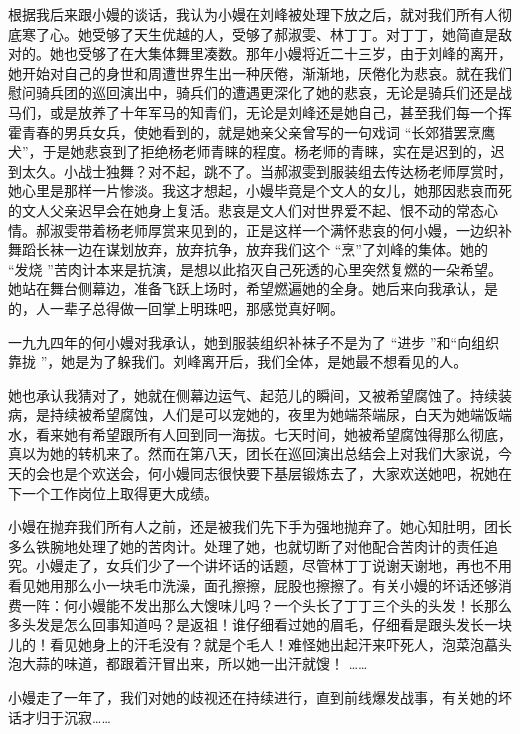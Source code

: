 \documentclass[12pt,twoside,openany]{book}
\begin{document}
根据我后来跟小嫚的谈话，我认为小嫚在刘峰被处理下放之后，就对我们所有人彻底寒了心。她受够了天生优越的人，受够了郝淑雯、林丁丁。对丁丁，她简直是敌对的。她也受够了在大集体舞里凑数。那年小嫚将近二十三岁，由于刘峰的离开，她开始对自己的身世和周遭世界生出一种厌倦，渐渐地，厌倦化为悲哀。就在我们慰问骑兵团的巡回演出中，骑兵们的遭遇更深化了她的悲哀，无论是骑兵们还是战马们，或是放养了十年军马的知青们，无论是刘峰还是她自己，甚至我们每一个挥霍青春的男兵女兵，使她看到的，就是她亲父亲曾写的一句戏词 “长郊猎罢烹鹰犬”，于是她悲哀到了拒绝杨老师青睐的程度。杨老师的青睐，实在是迟到的，迟到太久。小战士独舞？对不起，跳不了。当郝淑雯到服装组去传达杨老师厚赏时，她心里是那样一片惨淡。我这才想起，小嫚毕竟是个文人的女儿，她那因悲哀而死的文人父亲迟早会在她身上复活。悲哀是文人们对世界爱不起、恨不动的常态心情。郝淑雯带着杨老师厚赏来见到的，正是这样一个满怀悲哀的何小嫚，一边织补舞蹈长袜一边在谋划放弃，放弃抗争，放弃我们这个 “烹”了刘峰的集体。她的 “发烧 ”苦肉计本来是抗演，是想以此掐灭自己死透的心里突然复燃的一朵希望。她站在舞台侧幕边，准备飞跃上场时，希望燃遍她的全身。她后来向我承认，是的，人一辈子总得做一回掌上明珠吧，那感觉真好啊。

一九九四年的何小嫚对我承认，她到服装组织补袜子不是为了 “进步 ”和“向组织靠拢 ”，她是为了躲我们。刘峰离开后，我们全体，是她最不想看见的人。

她也承认我猜对了，她就在侧幕边运气、起范儿的瞬间，又被希望腐蚀了。持续装病，是持续被希望腐蚀，人们是可以宠她的，夜里为她端茶端尿，白天为她端饭端水，看来她有希望跟所有人回到同一海拔。七天时间，她被希望腐蚀得那么彻底，真以为她的转机来了。然而在第八天，团长在巡回演出总结会上对我们大家说，今天的会也是个欢送会，何小嫚同志很快要下基层锻炼去了，大家欢送她吧，祝她在下一个工作岗位上取得更大成绩。

小嫚在抛弃我们所有人之前，还是被我们先下手为强地抛弃了。她心知肚明，团长多么铁腕地处理了她的苦肉计。处理了她，也就切断了对他配合苦肉计的责任追究。小嫚走了，女兵们少了一个讲坏话的话题，尽管林丁丁说谢天谢地，再也不用看见她用那么小一块毛巾洗澡，面孔擦擦，屁股也擦擦了。有关小嫚的坏话还够消费一阵：何小嫚能不发出那么大馊味儿吗？一个头长了丁丁三个头的头发！长那么多头发是怎么回事知道吗？是返祖！谁仔细看过她的眉毛，仔细看是跟头发长一块儿的！看见她身上的汗毛没有？就是个毛人！难怪她出起汗来吓死人，泡菜泡藠头泡大蒜的味道，都跟着汗冒出来，所以她一出汗就馊！ ……

小嫚走了一年了，我们对她的歧视还在持续进行，直到前线爆发战事，有关她的坏话才归于沉寂……
\end{document}

